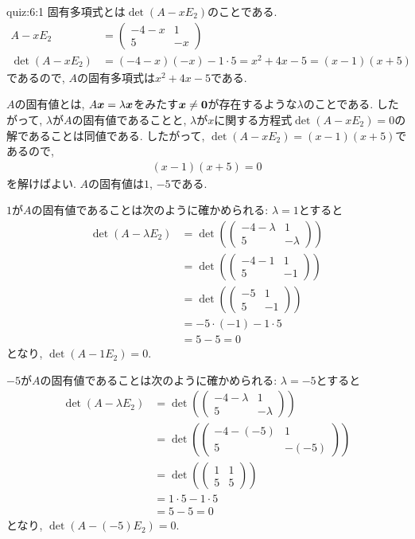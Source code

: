 \begin{answerof}{quiz:6:1}
固有多項式とは$\det(A-xE_2)$のことである.
  \begin{align*}
    A-xE_2&=\begin{pmatrix}-4-x&1\\5&-x\end{pmatrix}\\
    \det(A-xE_2)&=(-4-x)(-x)-1\cdot 5=x^2+4x-5=(x-1)(x+5)
  \end{align*}
  であるので, $A$の固有多項式は$x^2+4x-5$である.

  $A$の固有値とは, $A\boldsymbol{x}=\lambda\boldsymbol{x}$をみたす$\boldsymbol{x}\neq\boldsymbol{0}$が存在するような$\lambda$のことである.
  したがって, $\lambda$が$A$の固有値であることと, 
  $\lambda$が$x$に関する方程式$\det(A-xE_2)=0$の解であることは同値である.
  したがって, $\det(A-xE_2)=(x-1)(x+5)$であるので,
  \begin{align*}
    (x-1)(x+5)=0
  \end{align*}
  を解けばよい.  $A$の固有値は$1$, $-5$である.  
\end{answerof}
\begin{checkanswer}%
  $1$が$A$の固有値であることは次のように確かめられる:
  $\lambda=1$とすると
  \begin{align*}
    \det(A-\lambda E_2)
    &=\det(\begin{pmatrix}-4-\lambda&1\\5&-\lambda\end{pmatrix})\\
    &=\det(\begin{pmatrix}-4-1&1\\5&-1\end{pmatrix})\\
    &=\det(\begin{pmatrix}-5&1\\5&-1\end{pmatrix})\\
      &=-5\cdot(-1) -1\cdot5\\
      &=5-5=0
  \end{align*}
  となり, $\det(A-1 E_2)=0$.

  $-5$が$A$の固有値であることは次のように確かめられる:
  $\lambda=-5$とすると
  \begin{align*}
    \det(A-\lambda E_2)
    &=\det(\begin{pmatrix}-4-\lambda&1\\5&-\lambda\end{pmatrix})\\
    &=\det(\begin{pmatrix}-4-(-5)&1\\5&-(-5)\end{pmatrix})\\
    &=\det(\begin{pmatrix}1&1\\5&5\end{pmatrix})\\
      &=1\cdot5 -1\cdot5\\
      &=5-5=0
  \end{align*}
  となり, $\det(A-(-5) E_2)=0$.
\end{checkanswer}

